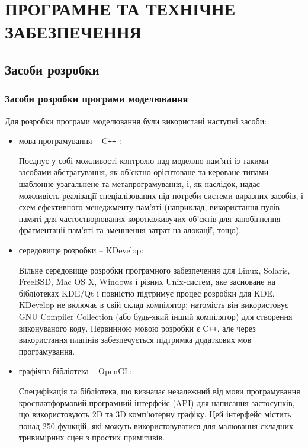 \section{ПРОГРАМНЕ ТА ТЕХНІЧНЕ ЗАБЕЗПЕЧЕННЯ}
\subsection{Засоби розробки}
\subsubsection{Засоби розробки програми моделювання}

Для розробки програми моделювання були використані наступні засоби:

\begin{itemize}\itemsep1em
  \item мова програмування -- C\verb!++!\cite{cpp} :

    Поєднує у собі можливості контролю над моделлю пам'яті із такими засобами абстрагування, як об'єктно-орієнтоване та кероване типами шаблонне узагальнене та метапрограмування, і, як наслідок, надає можливість реалізації спеціалізованих під потреби системи виразних засобів, і схем ефективного менеджменту пам'яті (наприклад, використання пулів памяті для частостворюваних короткоживучих об'єктів для запобігнення фрагментації пам'яті та зменшення затрат на алокації, тощо).

  \item середовище розробки -- KDevelop\cite{kdevelop}:

    Вільне середовище розробки програмного забезпечення для Linux, Solaris, FreeBSD, Mac OS X, Windows і різних Unix-систем, яке засноване на бібліотеках KDE/Qt і повністю підтримує процес розробки для KDE. KDevelop не включає в свій склад компілятор; натомість він використовує GNU Compiler Collection (або будь-який інший компілятор) для створення виконуваного коду. Первинною мовою розробки є C\verb!++!, але через використання плаґінів забезпечується підтримка додаткових мов програмування.

  \item графічна бібліотека -- OpenGL\cite{opengl}:

    Специфікація та бібліотека, що визначає незалежний від мови програмування кросплатформовий програмний інтерфейс (API) для написання застосунків, що використовують 2D та 3D комп'ютерну графіку. Цей інтерфейс містить понад 250 функцій, які можуть використовуватися для малювання складних тривимірних сцен з простих примітивів.


\end{itemize}
